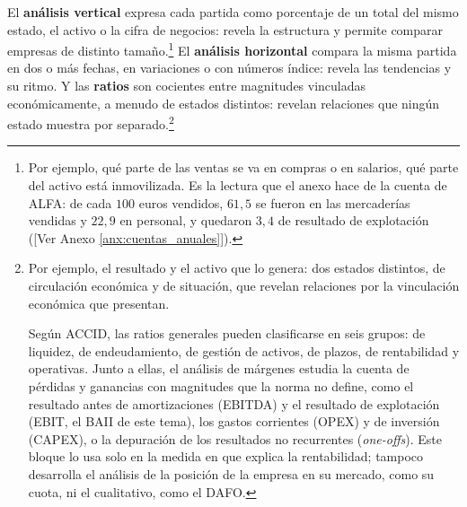 \documentclass[10pt,a4paper]{article}
\newcommand{\authorfont}[1]{{\fontfamily{EBGaramond-TLF}\selectfont #1}}
\newcounter{anexo}
\begin{document}
El \textbf{análisis vertical} expresa cada partida como porcentaje de un total del mismo estado, el activo o la cifra de negocios: revela la estructura y permite comparar empresas de distinto tamaño.\footnote{%
    Por ejemplo, qué parte de las ventas se va en compras o en salarios, qué parte del activo está inmovilizada. Es la lectura que el anexo hace de la cuenta de ALFA: de cada $100$ euros vendidos, $61{,}5$ se fueron en las mercaderías vendidas y $22{,}9$ en personal, y quedaron $3{,}4$ de resultado de explotación ([\authorfont{Ver Anexo \ref{anx:cuentas_anuales}}]).
} El \textbf{análisis horizontal} compara la misma partida en dos o más fechas, en variaciones o con números índice: revela las tendencias y su ritmo. Y las \textbf{ratios} son cocientes entre magnitudes vinculadas económicamente, a menudo de estados distintos: revelan relaciones que ningún estado muestra por separado.\footnote{%
    Por ejemplo, el resultado y el activo que lo genera: dos estados distintos, de circulación económica y de situación, que revelan relaciones por la vinculación económica que presentan.

    Según ACCID, las ratios generales pueden clasificarse en seis grupos: de liquidez, de endeudamiento, de gestión de activos, de plazos, de rentabilidad y operativas. Junto a ellas, el análisis de márgenes estudia la cuenta de pérdidas y ganancias con magnitudes que la norma no define, como el resultado antes de amortizaciones (EBITDA) y el resultado de explotación (EBIT, el BAII de este tema), los gastos corrientes (OPEX) y de inversión (CAPEX), o la depuración de los resultados no recurrentes (\textit{one-offs}). Este bloque lo usa solo en la medida en que explica la rentabilidad; tampoco desarrolla el análisis de la posición de la empresa en su mercado, como su cuota, ni el cualitativo, como el DAFO.
}
\end{document}
